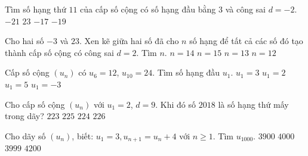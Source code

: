 \begin{ex}
	Tìm số hạng thứ $11$ của cấp số cộng có số hạng đầu bằng $3$ và công sai $d=-2$.
	\choice
	{$-21$}
	{$23$}
	{\True $-17$}
	{$-19$}
\end{ex}

\begin{ex}%
	Cho hai số $-3$ và $23$. Xen kẽ giữa hai số đã cho $n$ số hạng để tất cả các số đó tạo thành cấp số cộng có công sai $d=2$. Tìm $n$.
	\choice
	{$n = 14$}
	{$n = 15$}
	{$n = 13$}
	{\True $n = 12$}
\end{ex}

\begin{ex}%
	Cấp số cộng $(u_n)$ có $u_6=12$, $u_{10}=24$. Tìm số hạng đầu $u_1$.
	\choice
	{$u_1=3$}
	{$u_1=2$}
	{$u_1=5$}
	{\True $u_1=-3$}
\end{ex}

\begin{ex}
	Cho cấp số cộng $ (u_{n}) $ với $ u_{1}=2 $, $ d=9 $. Khi đó số $ 2018 $ là số hạng thứ mấy trong dãy?
	\choice
	{$ 223 $}
	{\True $ 225 $}
	{$ 224 $}
	{$ 226 $}
\end{ex}

\begin{ex} %
	Cho dãy số $\left({u_n}\right)$, biết: $u_1=3,u_{n+1}=u_n+4$ với $n\geqslant 1$. Tìm $u_{1000}$.
	\choice
	{$3900$}
	{$4000$}
	{\True $3999$}
	{$4200$}
\end{ex}

